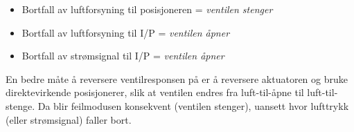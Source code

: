 \begin{itemize}
\item{} Bortfall av luftforsyning til posisjoneren = {\it ventilen stenger}
\item{} Bortfall av luftforsyning til I/P = {\it ventilen åpner}
\item{} Bortfall av strømsignal til I/P = {\it ventilen åpner}
\end{itemize}

\vskip 10pt

En bedre måte å reversere ventilresponsen på er å reversere aktuatoren og bruke direktevirkende posisjonerer, slik at ventilen endres fra luft-til-åpne til luft-til-stenge. Da blir feilmodusen konsekvent (ventilen stenger), uansett hvor lufttrykk (eller strømsignal) faller bort.



